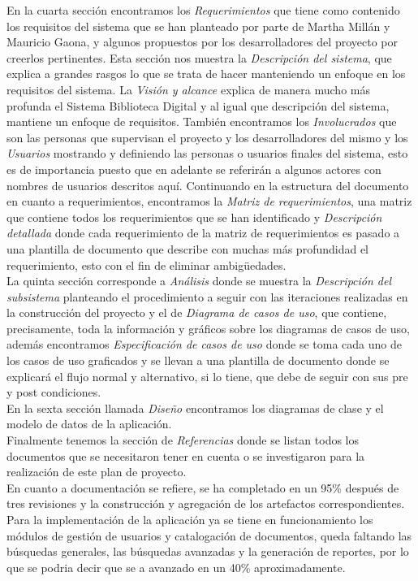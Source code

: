 En la cuarta sección encontramos los  \textit{Requerimientos} que tiene como contenido los
requisitos del sistema que se han planteado por parte de Martha Millán y Mauricio Gaona, y algunos
propuestos por los desarrolladores del proyecto por creerlos pertinentes. Esta sección nos muestra
la \textit{Descripción del sistema}, que explica a grandes rasgos lo que se trata de hacer
manteniendo un enfoque en los requisitos del sistema. La  \textit{Visión y alcance} explica de
manera mucho más profunda el Sistema Biblioteca Digital y al igual que descripción del sistema,
mantiene un enfoque de requisitos. También encontramos los \textit{Involucrados} que son las
personas que supervisan el proyecto y los desarrolladores del mismo y los \textit{Usuarios}
mostrando y definiendo las personas o usuarios finales del sistema, esto es de importancia puesto
que en adelante se referirán a algunos actores con nombres de usuarios descritos aquí. Continuando
en la estructura del documento en cuanto a requerimientos, encontramos la \textit{Matriz de
requerimientos}, una matriz que contiene todos los requerimientos que se han identificado y
\textit{Descripción detallada} donde cada requerimiento de la matriz de requerimientos es pasado a
una plantilla de documento que describe con muchas más profundidad el requerimiento, esto con el
fin de eliminar ambigüedades.\\

La quinta sección corresponde a \textit{Análisis} donde se muestra la \textit{Descripción del
subsistema} planteando el procedimiento a seguir con las iteraciones realizadas en la construcción
del proyecto y el de \textit{Diagrama de casos de uso}, que contiene, precisamente, toda la
información y gráficos sobre los diagramas de casos de uso, además encontramos
\textit{Especificación de casos de uso} donde se toma cada uno de los casos de uso graficados y se
llevan a una plantilla de documento donde se explicará el flujo normal y alternativo, si lo tiene,
que debe de seguir con sus pre y post condiciones.\\

En la sexta sección llamada \textit{Diseño} encontramos los diagramas de clase y el modelo de datos de la aplicación.\\

Finalmente tenemos la sección de \textit{Referencias} donde se listan todos los documentos que se
necesitaron tener en cuenta o se investigaron para la realización de este plan de proyecto.\\

En cuanto a documentación se refiere, se ha completado en un 95\% después de tres revisiones y la
construcción y agregación de los artefactos correspondientes. Para la implementación de la
aplicación ya se tiene en funcionamiento los módulos de gestión de usuarios y catalogación de
documentos, queda faltando las  búsquedas generales, las búsquedas avanzadas y la generación de
reportes, por lo que se podria decir que se a avanzado en un 40\% aproximadamente.

%